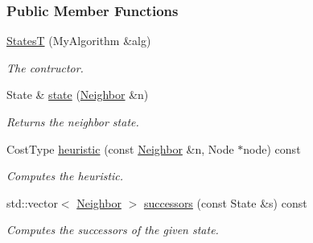 \subsubsection*{Public Member Functions}
\begin{DoxyCompactItemize}
\item 
\hyperlink{structgenerator_1_1StatesT_ae08b05b99d8e0dd322ddddfe449f7c61}{StatesT} (My\+Algorithm \&alg)
\begin{DoxyCompactList}\small\item\em The contructor. \end{DoxyCompactList}\item 
State \& \hyperlink{structgenerator_1_1StatesT_a160b807a9fcdacda66e0c495f267e6f2}{state} (\hyperlink{structgenerator_1_1StatesT_a3b9228d58aefe6f1685de405e80bf893}{Neighbor} \&n)
\begin{DoxyCompactList}\small\item\em Returns the neighbor state. \end{DoxyCompactList}\item 
Cost\+Type \hyperlink{structgenerator_1_1StatesT_a912287b2d9701aa104c1c37f03a858cf}{heuristic} (const \hyperlink{structgenerator_1_1StatesT_a3b9228d58aefe6f1685de405e80bf893}{Neighbor} \&n, Node $\ast$node) const 
\begin{DoxyCompactList}\small\item\em Computes the heuristic. \end{DoxyCompactList}\item 
std\+::vector$<$ \hyperlink{structgenerator_1_1StatesT_a3b9228d58aefe6f1685de405e80bf893}{Neighbor} $>$ \hyperlink{structgenerator_1_1StatesT_a696bf623cb9dd429472e7924c7a9e3ed}{successors} (const State \&s) const 
\begin{DoxyCompactList}\small\item\em Computes the successors of the given state. \end{DoxyCompactList}\end{DoxyCompactItemize}
